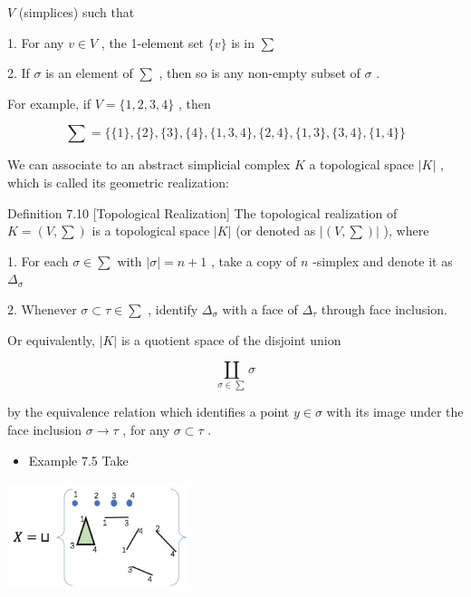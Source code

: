 \(V\) (simplices) such that

1. For any \(v \in  V\) , the 1-element set \(\{ v\}\) is in \(\sum\)

2. If \(\sigma\) is an element of \(\sum\) , then so is any non-empty subset of \(\sigma\) .

For example, if \(V = \{ 1,2,3,4\}\) , then

\[
\sum  = \{ \{ 1\} ,\{ 2\} ,\{ 3\} ,\{ 4\} ,\{ 1,3,4\} ,\{ 2,4\} ,\{ 1,3\} ,\{ 3,4\} ,\{ 1,4\} \}
\]

We can associate to an abstract simplicial complex \(K\) a topological space \(\left| K\right|\) , which is called its geometric realization:

Definition 7.10 [Topological Realization] The topological realization of \(K = \left( {V,\sum }\right)\) is a topological space \(\left| K\right|\) (or denoted as \(\left| \left( {V,\sum }\right) \right|\) ), where

1. For each \(\sigma  \in  \sum\) with \(\left| \sigma \right|  = n + 1\) , take a copy of \(n\) -simplex and denote it as \({\Delta }_{\sigma }\)

2. Whenever \(\sigma  \subset  \tau  \in  \sum\) , identify \({\Delta }_{\sigma }\) with a face of \({\Delta }_{\tau }\) through face inclusion.

Or equivalently, \(\left| K\right|\) is a quotient space of the disjoint union

\[
\mathop{\coprod }\limits_{{\sigma  \in  \sum }}\sigma
\]

by the equivalence relation which identifies a point \(y \in  \sigma\) with its image under the face inclusion \(\sigma  \rightarrow  \tau\) , for any \(\sigma  \subset  \tau\) .

\begin{itemize}
\item Example 7.5 Take
\end{itemize}

\begin{center}
\includegraphics[max width=0.4\textwidth]{images/bo_d2bcsrref24c73avs720_75_692_801_582_343_0.jpg}
\end{center}
\hspace*{3em} 

